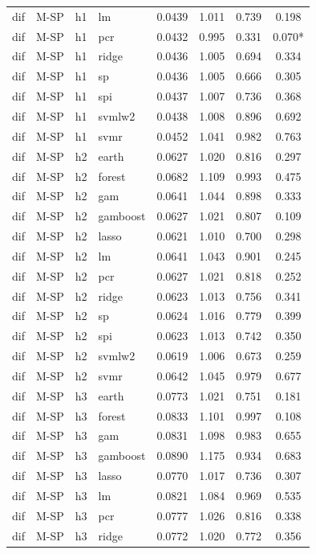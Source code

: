 \begin{ThreePartTable}
\begin{longtable}[t]{llclcccc}
dif & M-SP & h1 & lm & 0.0439 & 1.011 & 0.739 & 0.198\\
dif & M-SP & h1 & pcr & 0.0432 & 0.995 & 0.331 & 0.070*\\
dif & M-SP & h1 & ridge & 0.0436 & 1.005 & 0.694 & 0.334\\
dif & M-SP & h1 & sp & 0.0436 & 1.005 & 0.666 & 0.305\\
dif & M-SP & h1 & spi & 0.0437 & 1.007 & 0.736 & 0.368\\
dif & M-SP & h1 & svmlw2 & 0.0438 & 1.008 & 0.896 & 0.692\\
dif & M-SP & h1 & svmr & 0.0452 & 1.041 & 0.982 & 0.763\\
\addlinespace
dif & M-SP & h2 & earth & 0.0627 & 1.020 & 0.816 & 0.297\\
dif & M-SP & h2 & forest & 0.0682 & 1.109 & 0.993 & 0.475\\
dif & M-SP & h2 & gam & 0.0641 & 1.044 & 0.898 & 0.333\\
dif & M-SP & h2 & gamboost & 0.0627 & 1.021 & 0.807 & 0.109\\
dif & M-SP & h2 & lasso & 0.0621 & 1.010 & 0.700 & 0.298\\
dif & M-SP & h2 & lm & 0.0641 & 1.043 & 0.901 & 0.245\\
dif & M-SP & h2 & pcr & 0.0627 & 1.021 & 0.818 & 0.252\\
dif & M-SP & h2 & ridge & 0.0623 & 1.013 & 0.756 & 0.341\\
dif & M-SP & h2 & sp & 0.0624 & 1.016 & 0.779 & 0.399\\
dif & M-SP & h2 & spi & 0.0623 & 1.013 & 0.742 & 0.350\\
dif & M-SP & h2 & svmlw2 & 0.0619 & 1.006 & 0.673 & 0.259\\
dif & M-SP & h2 & svmr & 0.0642 & 1.045 & 0.979 & 0.677\\
\addlinespace
dif & M-SP & h3 & earth & 0.0773 & 1.021 & 0.751 & 0.181\\
dif & M-SP & h3 & forest & 0.0833 & 1.101 & 0.997 & 0.108\\
dif & M-SP & h3 & gam & 0.0831 & 1.098 & 0.983 & 0.655\\
dif & M-SP & h3 & gamboost & 0.0890 & 1.175 & 0.934 & 0.683\\
dif & M-SP & h3 & lasso & 0.0770 & 1.017 & 0.736 & 0.307\\
dif & M-SP & h3 & lm & 0.0821 & 1.084 & 0.969 & 0.535\\
dif & M-SP & h3 & pcr & 0.0777 & 1.026 & 0.816 & 0.338\\
dif & M-SP & h3 & ridge & 0.0772 & 1.020 & 0.772 & 0.356\\

\end{longtable}
\end{ThreePartTable}
